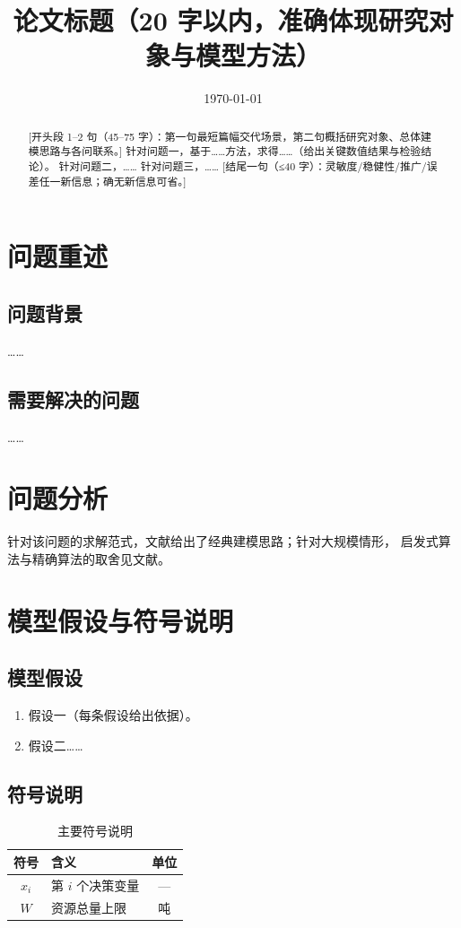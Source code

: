 \documentclass[withoutpreface,bwprint]{cumcmthesis}
\begin{document}
\title{论文标题（20 字以内，准确体现研究对象与模型方法）}
\date{\today}

\begin{abstract}
[开头段 1--2 句（45--75 字）：第一句最短篇幅交代场景，第二句概括研究对象、总体建模思路与各问联系。]
针对问题一，基于……方法，求得……（给出关键数值结果与检验结论）。
针对问题二，……
针对问题三，……
[结尾一句（≤40 字）：灵敏度/稳健性/推广/误差任一新信息；确无新信息可省。]
\end{abstract}


\section{问题重述}
\subsection{问题背景}
……
\subsection{需要解决的问题}
……

\section{问题分析}
针对该问题的求解范式，文献\cite{ref1}给出了经典建模思路；针对大规模情形，
启发式算法与精确算法的取舍见文献\cite{ref2}。

\section{模型假设与符号说明}
\subsection{模型假设}
\begin{enumerate}
  \item 假设一（每条假设给出依据）。
  \item 假设二……
\end{enumerate}
\subsection{符号说明}
\begin{table}[H]
\centering
\caption{主要符号说明}
\begin{tabular}{clc}
\toprule
符号 & 含义 & 单位 \\
\midrule
$x_i$ & 第 $i$ 个决策变量 & --- \\
$W$   & 资源总量上限 & 吨 \\
\bottomrule
\end{tabular}
\end{table}
\end{document}
